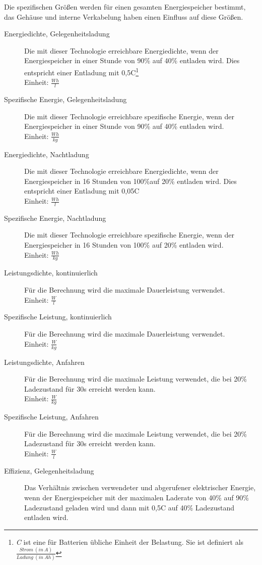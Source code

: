 Die spezifischen Größen werden für einen gesamten Energiespeicher bestimmt, das Gehäuse und interne Verkabelung haben einen Einfluss auf diese Größen. 
\begin{description}
	\item[Energiedichte, Gelegenheitsladung] Die mit dieser Technologie erreichbare Energiedichte, wenn der Energiespeicher in einer Stunde von 90\% auf 40\% entladen wird. Dies entspricht einer Entladung mit 0,5C\footnote{\emph{C} ist eine für Batterien übliche Einheit der Belastung. Sie ist definiert als $\frac{Strom\ (in\ A)}{Ladung\ (in\ Ah)}$}\\
	Einheit: $\frac{Wh}{l}$ 
	\item[Spezifische Energie, Gelegenheitsladung] Die mit dieser Technologie erreichbare spezifische Energie, wenn der Energiespeicher in einer Stunde von 90\% auf 40\% entladen wird.\\
	Einheit: $\frac{Wh}{kg}$
	\item[Energiedichte, Nachtladung] Die mit dieser Technologie erreichbare Energiedichte, wenn der Energiespeicher in 16 Stunden von 100\%auf 20\% entladen wird. Dies entspricht einer Entladung mit 0,05C\\
	Einheit: $\frac{Wh}{l}$
	\item[Spezifische Energie, Nachtladung] Die mit dieser Technologie erreichbare spezifische Energie, wenn der Energiespeicher in 16 Stunden von 100\% auf 20\% entladen wird.\\
	Einheit: $\frac{Wh}{kg}$
	\item[Leistungsdichte, kontinuierlich] Für die Berechnung wird die maximale Dauerleistung verwendet.\\
	Einheit: $\frac{W}{l}$
	\item[Spezifische Leistung, kontinuierlich] Für die Berechnung wird die maximale Dauerleistung verwendet.\\
	Einheit: $\frac{W}{kg}$
	\item[Leistungsdichte, Anfahren] Für die Berechnung wird die maximale Leistung verwendet, die bei 20\% Ladezustand für 30s erreicht werden kann.\\
	Einheit: $\frac{W}{kg}$
	\item[Spezifische Leistung, Anfahren] Für die Berechnung wird die maximale Leistung verwendet, die bei 20\% Ladezustand für 30s erreicht werden kann.\\
	Einheit: $\frac{W}{l}$
	\item[Effizienz, Gelegenheitsladung] Das Verhältnis zwischen verwendeter und abgerufener elektrischer Energie, wenn der Energiespeicher mit der maximalen Laderate von 40\% auf 90\% Ladezustand geladen wird und dann mit 0,5C auf 40\% Ladezustand entladen wird.\\

\end{description}
